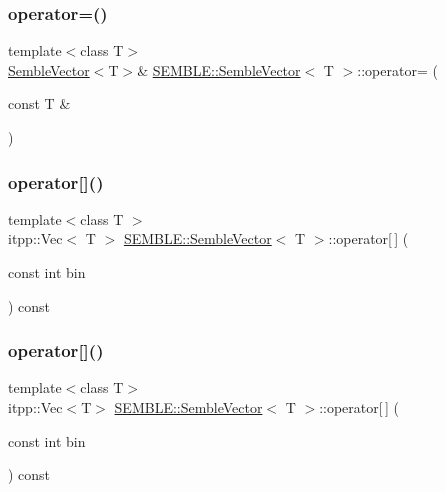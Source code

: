 \subsubsection{\texorpdfstring{operator=()}{operator=()}\hspace{0.1cm}{\footnotesize\ttfamily [8/8]}}
{\footnotesize\ttfamily template$<$class T$>$ \\
\mbox{\hyperlink{structSEMBLE_1_1SembleVector}{Semble\+Vector}}$<$T$>$\& \mbox{\hyperlink{structSEMBLE_1_1SembleVector}{S\+E\+M\+B\+L\+E\+::\+Semble\+Vector}}$<$ T $>$\+::operator= (\begin{DoxyParamCaption}\item[{const T \&}]{ }\end{DoxyParamCaption})}

\mbox{\label{structSEMBLE_1_1SembleVector_ac29f93351529fd38cd7fe34a8eb97837}} 
\subsubsection{\texorpdfstring{operator[]()}{operator[]()}\hspace{0.1cm}{\footnotesize\ttfamily [1/4]}}
{\footnotesize\ttfamily template$<$class T $>$ \\
itpp\+::\+Vec$<$ T $>$ \mbox{\hyperlink{structSEMBLE_1_1SembleVector}{S\+E\+M\+B\+L\+E\+::\+Semble\+Vector}}$<$ T $>$\+::operator\mbox{[}$\,$\mbox{]} (\begin{DoxyParamCaption}\item[{const int}]{bin }\end{DoxyParamCaption}) const}

\mbox{\label{structSEMBLE_1_1SembleVector_a4414339e2adc695429190b1cdda57463}} 
\subsubsection{\texorpdfstring{operator[]()}{operator[]()}\hspace{0.1cm}{\footnotesize\ttfamily [2/4]}}
{\footnotesize\ttfamily template$<$class T$>$ \\
itpp\+::\+Vec$<$T$>$ \mbox{\hyperlink{structSEMBLE_1_1SembleVector}{S\+E\+M\+B\+L\+E\+::\+Semble\+Vector}}$<$ T $>$\+::operator\mbox{[}$\,$\mbox{]} (\begin{DoxyParamCaption}\item[{const int}]{bin }\end{DoxyParamCaption}) const}

